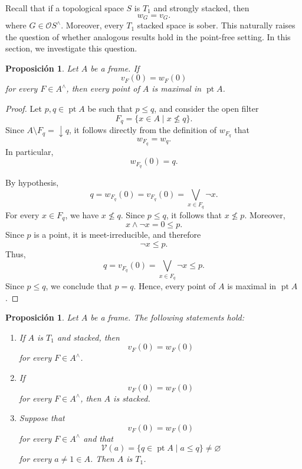 \documentclass[11pt]{amsart}
\DeclareMathOperator{\pt}{pt}
\theoremstyle{plain}
\newtheorem{prop}[thm]{Proposición}
\theoremstyle{definition}
\begin{document}
Recall that if a topological space $S$ is $T_1$ and strongly stacked, then
\[
w_G=v_G.
\]
where $G\in \mathcal{O}S^\wedge$. Moreover, every $T_1$ stacked space is sober. This naturally raises the
question of whether analogous results hold in the point-free setting. In this
section, we investigate this question.

\begin{prop}\label{maximosenpt}
Let $A$ be a frame. If
\[
v_F(0)=w_F(0)
\]
for every $F\in A^\wedge$, then every point of $A$ is maximal in $\pt A$.
\end{prop}

\begin{proof}
Let $p,q\in\pt A$ be such that $p\leq q$, and consider the open filter
\[
F_q=\{x\in A\mid x\nleq q\}.
\]
Since $A\setminus F_q=\downarrow q$, it follows directly from the
definition of $w_{F_q}$ that
\begin{equation}\label{igualdadwF_p}
w_{F_q}=w_q.
\end{equation}
In particular,
\[
w_{F_q}(0)=q.
\]

By hypothesis,
\[
q=w_{F_q}(0)=v_{F_q}(0)
=\bigvee_{x\in F_q}\neg x.
\]
For every $x\in F_q$, we have $x\nleq q$. Since $p\leq q$, it follows
that $x\nleq p$. Moreover,
\[
x\wedge\neg x=0\leq p.
\]
Since $p$ is a point, it is meet-irreducible, and therefore
\[
\neg x\leq p.
\]
Thus,
\[
q=v_{F_q}(0)
=\bigvee_{x\in F_q}\neg x
\leq p.
\]
Since $p\leq q$, we conclude that $p=q$. Hence, every point of $A$ is
maximal in 
$\pt A$.
\end{proof}

\begin{prop}\label{focales}
Let $A$ be a frame. The following statements hold:
\begin{enumerate}
    \item If $A$ is $T_1$ and stacked, then
    \[
    v_F(0)=w_F(0)
    \]
    for every $F\in A^\wedge$.

    \item If
    \[
    v_F(0)=w_F(0)
    \]
    for every $F\in A^\wedge$, then $A$ is stacked.

    \item Suppose that
    \[
    v_F(0)=w_F(0)
    \]
    for every $F\in A^\wedge$ and that
    \[
    \mathcal{V}(a)=\{q\in\pt A\mid a\leq q\}\neq\varnothing
    \]
    for every $a\neq 1\in A$. Then $A$ is $T_1$.
\end{enumerate}
\end{prop}
\end{document}
